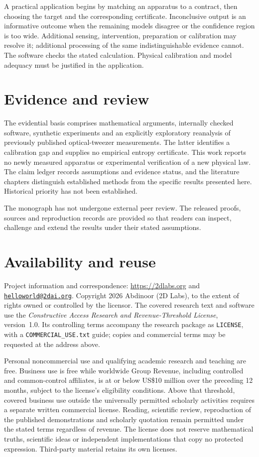 A practical application begins by matching an apparatus to a contract, then
choosing the target and the corresponding certificate. Inconclusive output is
an informative outcome when the remaining models disagree or the confidence
region is too wide. Additional sensing, intervention, preparation or calibration
may resolve it; additional processing of the same indistinguishable evidence
cannot. The software checks the stated calculation. Physical calibration and
model adequacy must be justified in the application.

\section*{Evidence and review}

The evidential basis comprises mathematical arguments, internally checked
software, synthetic experiments and an explicitly exploratory reanalysis of
previously published optical-tweezer measurements. The latter identifies a
calibration gap and supplies no empirical entropy certificate. This work
reports no newly measured apparatus or experimental verification of a new
physical law. The claim ledger records assumptions and evidence status, and
the literature chapters distinguish established methods from the specific
results presented here. Historical priority has not been established.

The monograph has not undergone external peer review. The
released proofs, sources and reproduction records are provided so that readers
can inspect, challenge and extend the results under their stated assumptions.

\section*{Availability and reuse}

Project information and correspondence:
\url{https://2dlabs.org} and
\href{mailto:helloworld@2dai.org}{\nolinkurl{helloworld@2dai.org}}.
Copyright \textcopyright{} 2026 Abdinoor (2D Labs), to the extent of rights
owned or controlled by the licensor. The covered research text and software
use the \emph{Constructive Access Research and Revenue-Threshold License},
version~1.0. Its controlling terms accompany the research package as
\texttt{LICENSE}, with a \texttt{COMMERCIAL\_USE.txt} guide; copies and
commercial terms may be requested at the address above.

Personal noncommercial use and qualifying academic research and teaching are
free. Business use is free while worldwide Group Revenue, including controlled
and common-control affiliates, is at or below US\$10 million over the preceding
12 months, subject to the license's eligibility conditions. Above that
threshold, covered business use outside the universally permitted scholarly
activities requires a separate written commercial license. Reading, scientific
review, reproduction of the published demonstrations and scholarly quotation
remain permitted under the stated terms regardless of revenue. The license
does not reserve mathematical truths, scientific ideas or independent
implementations that copy no protected expression. Third-party material
retains its own licenses.
